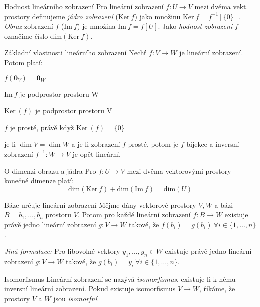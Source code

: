 \begin{definiceN}{Hodnost lineárního zobrazení}
Pro lineární zobrazení $f:U\to V$ mezi dvěma vekt. prostory definujeme \emph{jádro zobrazení} ($\mathrm{Ker\ }f$) jako množinu $\mathrm{Ker\ }f=f^{-1}[\{0\}]$. \emph{Obraz} zobrazení $f$ ($\mathrm{Im\ }f$) je množina $\mathrm{Im\ }f=f[U]$. Jako \emph{hodnost zobrazení} $f$ označíme číslo $\mathrm{dim}(\mathrm{Ker\ }f)$.
\end{definiceN}


\begin{vetaN}{Základní vlastnosti lineárního zobrazení}
Nechť $f: V \rightarrow W$ je lineární zobrazení. Potom platí:
\begin{penumerate}
	\item $f(\mathbf{0}_V) = \mathbf{0}_W$
	\item $\mathrm{Im\ }f$ je podprostor prostoru W
	\item $\mathrm{Ker\ }(f)$ je podprostor prostoru V
	\item $f$ je prosté, právě když $\mathrm{Ker\ }(f) = \{0\}$
	\item je-li $\dim V = \dim W$ a je-li zobrazení $f$ prosté, potom je $f$ bijekce a inversní zobrazení $f^{-1}: W \rightarrow V$ je opět lineární.
\end{penumerate}
\end{vetaN}

\begin{vetaN}{O dimenzi obrazu a jádra}
Pro $f:U\to V$ mezi dvěma vektorovými prostory konečné dimenze platí:
$$\mathrm{dim}(\mathrm{Ker\ }f)+\mathrm{dim}(\mathrm{Im\ }f)=\mathrm{dim}(U)$$
\end{vetaN}

\begin{vetaN}{Báze určuje lineární zobrazení}
Mějme dány vektorové prostory $V,W$ a bázi $B=b_1,\dots,b_n$ prostoru $V$. Potom pro každé lineární zobrazení $f:B\to W$ existuje právě jedno lineární zobrazení $g:V\to W$ takové, že $f(b_i)=g(b_i)\ \forall i\in\{1,\dots,n\}$.

\emph{Jiná formulace:} Pro libovolné vektory $y_1,\dots,y_n\in W$ existuje právě jedno lineární zobrazení $g:V\to W$ takové, že $g(b_i)=y_i\ \forall i\in\{1,\dots,n\}$.
\end{vetaN}


\begin{definiceN}{Isomorfismus}
Lineární zobrazení se nazývá \emph{isomorfismus}, existuje-li k němu inversní lineární zobrazení. Pokud existuje isomorfismus $V \to W$, říkáme, že prostory $V$ a $W$ jsou \emph{isomorfní}.
\end{definiceN}

